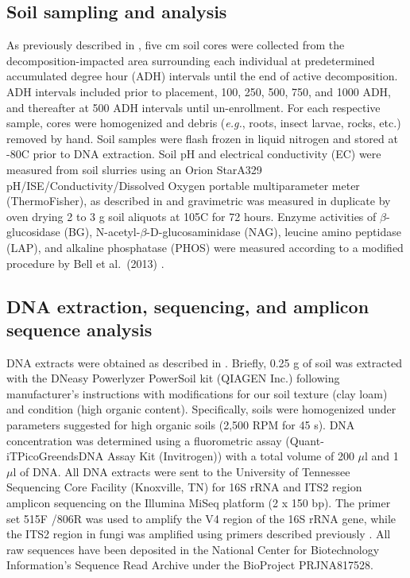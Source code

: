 \documentclass[
  10pt,
  letterpaper,
]{article}
\begin{document}
\hypertarget{soil-sampling-and-analysis}{%
\subsection{Soil sampling and
analysis}\label{soil-sampling-and-analysis}}

As previously described in \citep{mason_body_2022}, five cm soil cores
were collected from the decomposition-impacted area surrounding each
individual at predetermined accumulated degree hour (ADH) intervals
until the end of active decomposition. ADH intervals included prior to
placement, 100, 250, 500, 750, and 1000 ADH, and thereafter at 500 ADH
intervals until un-enrollment. For each respective sample, cores were
homogenized and debris (\emph{e.g.}, roots, insect larvae, rocks, etc.)
removed by hand. Soil samples were flash frozen in liquid nitrogen and
stored at -80\textdegree C prior to DNA extraction. Soil pH and
electrical conductivity (EC) were measured from soil slurries using an
Orion Star\texttrademark  A329 pH/ISE/Conductivity/Dissolved Oxygen
portable multiparameter meter (ThermoFisher), as described in
\citep{mason_body_2022} and gravimetric was measured in duplicate by
oven drying 2 to 3 g soil aliquots at 105\textdegree C for 72 hours.
Enzyme activities of \(\beta\)-glucosidase (BG),
N-acetyl-\(\beta\)-D-glucosaminidase (NAG), leucine amino peptidase
(LAP), and alkaline phosphatase (PHOS) were measured according to a
modified procedure by Bell et al.~(2013)
\citep{mason_body_2022, bell_high-throughput_2013}.

\hypertarget{dna-extraction-sequencing-and-amplicon-sequence-analysis}{%
\subsection{DNA extraction, sequencing, and amplicon sequence
analysis}\label{dna-extraction-sequencing-and-amplicon-sequence-analysis}}

DNA extracts were obtained as described in \citep{mason_body_2022}.
Briefly, 0.25 g of soil was extracted with the DNeasy Powerlyzer
PowerSoil kit (QIAGEN Inc.) following manufacturer's instructions with
modifications for our soil texture (clay loam) and condition (high
organic content). Specifically, soils were homogenized under parameters
suggested for high organic soils (2,500 RPM for 45 s). DNA concentration
was determined using a fluorometric assay
(Quant-iT\texttrademark  PicoGreen\textregistered  dsDNA Assay Kit
(Invitrogen)) with a total volume of 200 \(\mu\)l and 1 \(\mu\)l of DNA.
All DNA extracts were sent to the University of Tennessee Sequencing
Core Facility (Knoxville, TN) for 16S rRNA and ITS2 region amplicon
sequencing on the Illumina MiSeq platform (2 x 150 bp). The primer set
515F \citep{parada_every_2016} /806R \citep{apprill_minor_2015} was used
to amplify the V4 region of the 16S rRNA gene, while the ITS2 region in
fungi was amplified using primers described previously
\citep{mason_body_2022, cregger_populus_2018}. All raw sequences have
been deposited in the National Center for Biotechnology Information's
Sequence Read Archive under the BioProject PRJNA817528.
\end{document}
